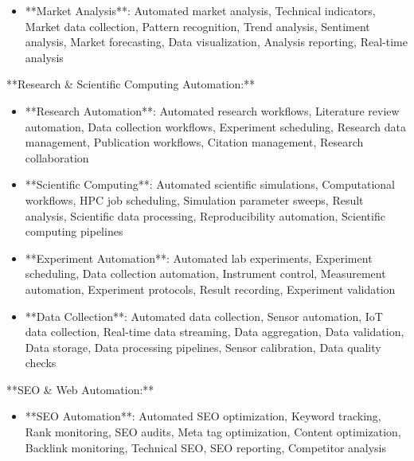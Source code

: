 \documentclass[11pt,a4paper]{article}
\begin{document}
\begin{itemize}
\item **Market Analysis**: Automated market analysis, Technical indicators, Market data collection, Pattern recognition, Trend analysis, Sentiment analysis, Market forecasting, Data visualization, Analysis reporting, Real-time analysis
\end{itemize}

**Research \& Scientific Computing Automation:**

\begin{itemize}
\item **Research Automation**: Automated research workflows, Literature review automation, Data collection workflows, Experiment scheduling, Research data management, Publication workflows, Citation management, Research collaboration
\end{itemize}

\begin{itemize}
\item **Scientific Computing**: Automated scientific simulations, Computational workflows, HPC job scheduling, Simulation parameter sweeps, Result analysis, Scientific data processing, Reproducibility automation, Scientific computing pipelines
\end{itemize}

\begin{itemize}
\item **Experiment Automation**: Automated lab experiments, Experiment scheduling, Data collection automation, Instrument control, Measurement automation, Experiment protocols, Result recording, Experiment validation
\end{itemize}

\begin{itemize}
\item **Data Collection**: Automated data collection, Sensor automation, IoT data collection, Real-time data streaming, Data aggregation, Data validation, Data storage, Data processing pipelines, Sensor calibration, Data quality checks
\end{itemize}

**SEO \& Web Automation:**

\begin{itemize}
\item **SEO Automation**: Automated SEO optimization, Keyword tracking, Rank monitoring, SEO audits, Meta tag optimization, Content optimization, Backlink monitoring, Technical SEO, SEO reporting, Competitor analysis
\end{itemize}
\end{document}
